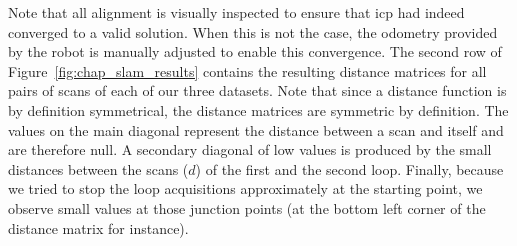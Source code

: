 Note that all alignment is visually inspected to ensure that \gls*{icp} had indeed converged to a valid solution. When this is not the case, the odometry provided by the robot is manually adjusted to enable this convergence. The second row of Figure~\ref{fig:chap_slam_results} contains the resulting distance matrices for all pairs of scans of each of our three datasets. Note that since a distance function is by definition symmetrical, the distance matrices are symmetric by definition. The values on the main diagonal represent the distance between a scan and itself and are therefore null. A secondary diagonal of low values is produced by the small distances between the scans ($d$) of the first and the second loop. Finally, because we tried to stop the loop acquisitions approximately at the starting point, we observe small values at those junction points (at the bottom left corner of the distance matrix for instance).

